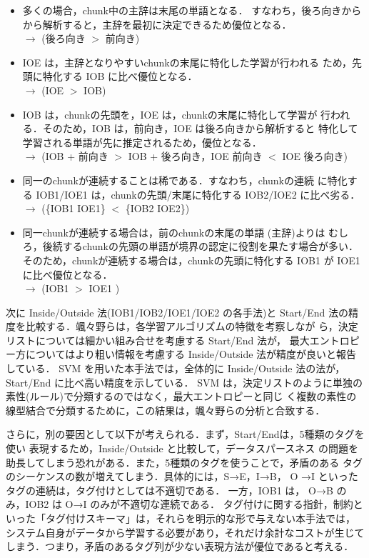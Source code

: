 \begin{itemize}
 \item 多くの場合，chunk中の主辞は末尾の単語となる．
       すなわち，後ろ向きからから解析すると，主辞を最初に決定できるため優位となる．\\
       $\rightarrow$        (後ろ向き $>$ 前向き)
 \item IOE は，主辞となりやすいchunkの末尾に特化した学習が行われる
       ため，先頭に特化する IOB に比べ優位となる．\\ $\rightarrow$ (IOE $>$ IOB)
 \item IOB は，chunkの先頭を，IOE は，chunkの末尾に特化して学習が
       行われる．そのため，IOB は，前向き，IOE は後ろ向きから解析すると
       特化して学習される単語が先に推定されるため，優位となる．\\
 $\rightarrow$ 
       (IOB + 前向き $>$ IOB + 後ろ向き，IOE 前向き $<$ IOE 後ろ向き)
 \item 同一のchunkが連続することは稀である．すなわち，chunkの連続
       に特化する IOB1/IOE1 は，chunkの先頭/末尾に特化する IOB2/IOE2 に比べ劣る．
       \\ $\rightarrow$  (\{IOB1 IOE1\} $<$ \{IOB2 IOE2\})
 \item 同一chunkが連続する場合は，前のchunkの末尾の単語 (主辞)よりは
       むしろ，後続するchunkの先頭の単語が境界の認定に役割を果たす場合が多い．
       そのため，chunkが連続する場合は，chunkの先頭に特化する IOB1 が
       IOE1 に比べ優位となる．\\ $\rightarrow$  (IOB1 $>$ IOE1 )
\end{itemize}

次に Inside/Outside 法(IOB1/IOB2/IOE1/IOE2 の各手法)と Start/End 法の精
度を比較する．颯々野らは，各学習アルゴリズムの特徴を考察しなが
ら，決定リストについては細かい組み合せを考慮する Start/End 法が，
最大エントロピー方についてはより粗い情報を考慮する
Inside/Outside 法が精度が良いと報告している\cite{Sassano00b}．
SVM を用いた本手法では，全体的に Inside/Outside 法の法が，Start/End に比べ高い精度を示している．
SVM は，決定リストのように単独の素性(ルール)で分類するのではなく，最大エントロピーと同じ
く複数の素性の線型結合で分類するために，この結果は，颯々野らの分析と合致する．

さらに，別の要因として以下が考えられる．まず，Start/Endは，5種類のタグを使い
表現するため，Inside/Outside と比較して，データスパースネス
の問題を助長してしまう恐れがある．また，5種類のタグを使うことで，矛盾のある
タグのシーケンスの数が増えてしまう．具体的には，S→E，I→B，
O →I といったタグの連続は，タグ付けとしては不適切である．
一方，IOB1 は， O→B のみ，IOB2 は O→I のみが不適切な連続である．
タグ付けに関する指針，制約といった「タグ付けスキーマ」は，それらを明示的な形で与えない本手法では，
システム自身がデータから学習する必要があり，それだけ余計なコストが生じて
しまう．つまり，矛盾のあるタグ列が少ない表現方法が優位であると考える．

